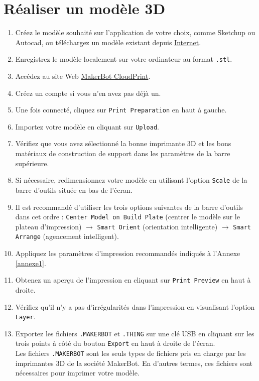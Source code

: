 \documentclass{Thesis}
\begin{document}
\section{Réaliser un modèle 3D}
\begin{enumerate}
    \item Créez le modèle souhaité sur l'application de votre choix, comme Sketchup ou Autocad, ou téléchargez un modèle existant depuis \href{https://www.thingiverse.com/}{Internet}.
    \item Enregistrez le modèle localement sur votre ordinateur au format \texttt{.stl}.
    \item Accédez au site Web \href{https://login.makerbot.com/login?redirect=https%3A%2F%2Fcloudprint.makerbot.com%2Fprint}{MakerBot CloudPrint}.
    \item Créez un compte si vous n'en avez pas déjà un.
    \item Une fois connecté, cliquez sur \texttt{Print Preparation} en haut à gauche.
    \item Importez votre modèle en cliquant sur \texttt{Upload}.
    \item Vérifiez que vous avez sélectionné la bonne imprimante 3D et les bons matériaux de construction de support dans les paramètres de la barre supérieure.
    \item Si nécessaire, redimensionnez votre modèle en utilisant l'option \texttt{Scale} de la barre d'outils située en bas de l'écran.
    \item Il est recommandé d'utiliser les trois options suivantes de la barre d'outils dans cet ordre : \texttt{Center Model on Build Plate} (centrer le modèle sur le plateau d'impression) $\rightarrow$ \texttt{Smart Orient} (orientation intelligente) $\rightarrow$ \texttt{Smart Arrange} (agencement intelligent).
    \item Appliquez les paramètres d'impression recommandés indiqués à l'Annexe \ref{annexe1}.
    \item Obtenez un aperçu de l'impression en cliquant sur \texttt{Print Preview} en haut à droite.
    \item Vérifiez qu'il n'y a pas d'irrégularités dans l'impression en visualisant l'option \texttt{Layer}.
    \item Exportez les fichiers \texttt{.MAKERBOT} et \texttt{.THING} sur une clé USB en cliquant sur les trois points à côté du bouton \texttt{Export} en haut à droite de l'écran.\\
        Les fichiers \texttt{.MAKERBOT} sont les seuls types de fichiers pris en charge par les imprimantes 3D de la société MakerBot. En d'autres termes, ces fichiers sont nécessaires pour imprimer votre modèle.\\

\end{enumerate}
\end{document}
